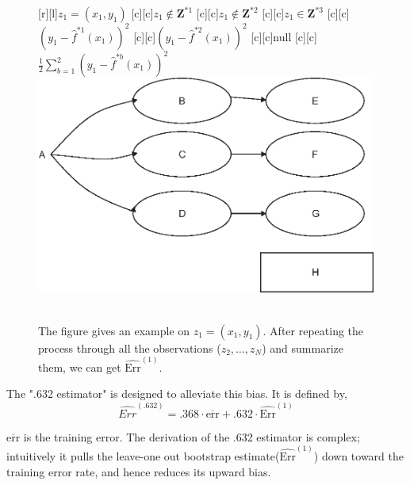 \documentclass[12pt,a4paper]{article}%
\theoremstyle{definition}
\theoremstyle{plain}
\numberwithin{equation}{section}
\begin{document}
\begin{figure}[H]
\centering
{}[r][l]{\footnotesize $z_{1}=(x_{1},y_{1})$}
[c][c]{\footnotesize $z_{1} \not\in \boldsymbol{Z}^{*1} $}
[c][c]{\footnotesize $z_{1} \not\in \boldsymbol{Z}^{*2}$}
[c][c]{\footnotesize $z_{1} \in \boldsymbol{Z}^{*3}$}
[c][c]{\footnotesize $(y_{1}-\hat{f}^{*1}(x_{1}))^{2}$}
[c][c]{\footnotesize $(y_{1}-\hat{f}^{*2}(x_{1}))^{2}$}
[c][c]{\footnotesize null}
[c][c]{\footnotesize $\frac{1}{2} \sum\limits_{b=1}^{2} (y_{1}-\hat{f}^{*b}(x_{1}))^{2}$}
\includegraphics[scale=0.8]{images//bootstrap_loo.eps}
\\~\\
\caption{The figure gives an example on $z_{1}=(x_{1},y_{1})$. After repeating the process through all the observations ($z_{2},\dots,z_{N}$) and summarize them, we can get $\widehat{\text{Err}}^{(1)}$.}\label{bootstrap_loo}
\end{figure}

The ".632 estimator" is designed to alleviate this bias. It is defined by,
\begin{equation*}
\widehat{Err}^{(.632)} = .368 \cdot \overline{\text{err}} + .632 \cdot \widehat{\text{Err}}^{(1)}
\end{equation*}

$\overline{\text{err}}$ is the training error. The derivation of the .632 estimator is complex; intuitively it pulls the leave-one out bootstrap estimate($\widehat{\text{Err}}^{(1)}$) down toward the training error rate, and hence reduces its upward bias.
\end{document}
